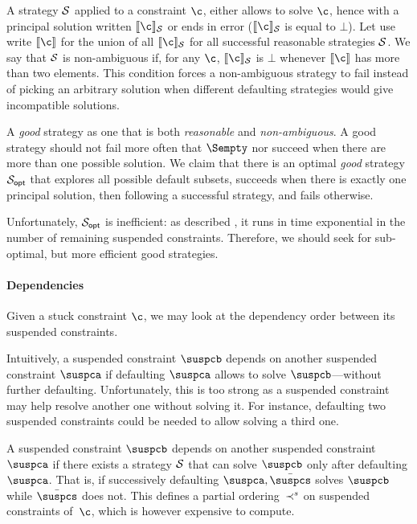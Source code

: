 A strategy $\S$ applied to a constraint $\c$, either allows to solve $\c$,
hence with a principal solution written $\Ssol \S$ or ends in error ($\Ssol
\S$ is equal to $\bot$).  Let use write $\Sols$ for the union of
all $\Ssol \S$ for all successful reasonable strategies $\S$.
%
We say that $\S$ is non-ambiguous if, for any $\c$, $\Ssol \S$ is $\bot$
whenever $\Sols$ has more than two elements.  This condition forces a
non-ambiguous strategy to fail instead of picking an arbitrary solution when
different defaulting strategies would give incompatible solutions.

A \emph{good} strategy as one that is both \emph{reasonable} and
\emph{non-ambiguous}. A good strategy should not fail more often that
$\Sempty$ nor succeed when there are more than one possible solution.
%
We claim that there is an optimal \emph{good} strategy $\Sopt$ that explores all
possible default subsets, succeeds when there is exactly one principal
solution, then following a successful strategy, and fails otherwise.

Unfortunately, $\Sopt$ is inefficient: as described , it runs in time
exponential in the number of remaining suspended constraints.  Therefore, we
should seek for sub-optimal, but more efficient good strategies.

\paragraph {Dependencies}

Given a stuck constraint $\c$, we may look at the dependency order between
its suspended constraints.
\begin{version}{}

Intuitively, a suspended constraint  $\suspcb$
depends on another suspended constraint $\suspca$
if defaulting  $\suspca$ allows to solve $\suspcb$---without further
defaulting.  Unfortunately, this is too strong as a suspended constraint may
help resolve another one without solving it. For instance, defaulting two
suspended constraints could be needed to allow solving a third one.

\end{version}
A suspended constraint $\suspcb$ depends on another suspended
constraint~$\suspca$ if there exists a strategy $\S$ that can solve
$\suspcb$ only after defaulting $\suspca$.  That is, if successively
defaulting $\suspca, \bar \suspcs$ solves $\suspcb$ while $\bar \suspcs$
does not.
%
This defines a partial ordering~$\cprec^s$ on suspended constraints of~$\c$,
which is however expensive to compute.

